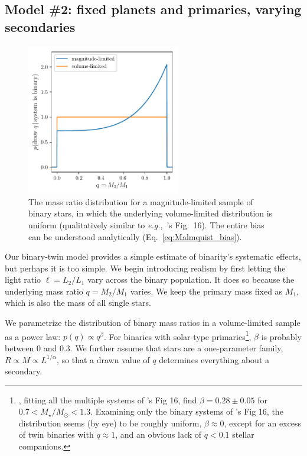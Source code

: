 \subsection{Model \#2: fixed planets and primaries, varying secondaries}
\label{sec:model_2}

\begin{figure}[!tb]
    \centering
    \includegraphics[width=0.6\textwidth]{figures/mass_ratio_distribution.pdf}
    \caption{
        The mass ratio distribution for a magnitude-limited sample of 
        binary stars, in which the underlying volume-limited distribution is 
        uniform (qualitatively similar to {\it 
        e.g.},~\citet{raghavan_survey_2010}'s Fig.~16).
        The entire bias can be understood analytically 
        (Eq.~\ref{eq:Malmquist_bias}).
    }
    \label{fig:q_distribn_mag_limited}
\end{figure}

Our binary-twin model provides a simple estimate of binarity's systematic 
effects, but perhaps it is too simple.
We begin introducing realism by first letting the light ratio $\ell = L_2/L_1$ 
vary across the binary population.
It does so because the underlying mass ratio $q=M_2/M_1$ varies.
We keep the primary mass fixed as $M_1$, which is also the mass of all single 
stars.

We parametrize the distribution of binary mass ratios in a volume-limited 
sample as a power law: $p(q)\propto q^\beta$.
For binaries with solar-type primaries\footnote{
\citet{duchene_stellar_2013}, fitting all the multiple systems of 
\citet{raghavan_survey_2010}'s Fig 16, find $\beta = 0.28\pm0.05$ for 
$0.7<M_\star/M_\odot<1.3$.
Examining only the binary systems of \citeauthor{raghavan_survey_2010}'s Fig 
16, the distribution seems (by eye) to be roughly uniform, $\beta \approx 0$, 
except for an excess of twin binaries with $q\approx 1$, and an obvious 
lack of $q<0.1$ stellar companions.
}, $\beta$ is probably between 0 and 0.3.
We further assume that stars are a one-parameter family, $R \propto M \propto 
L^{1/\alpha}$, so that a drawn value of $q$ determines everything about a 
secondary.

